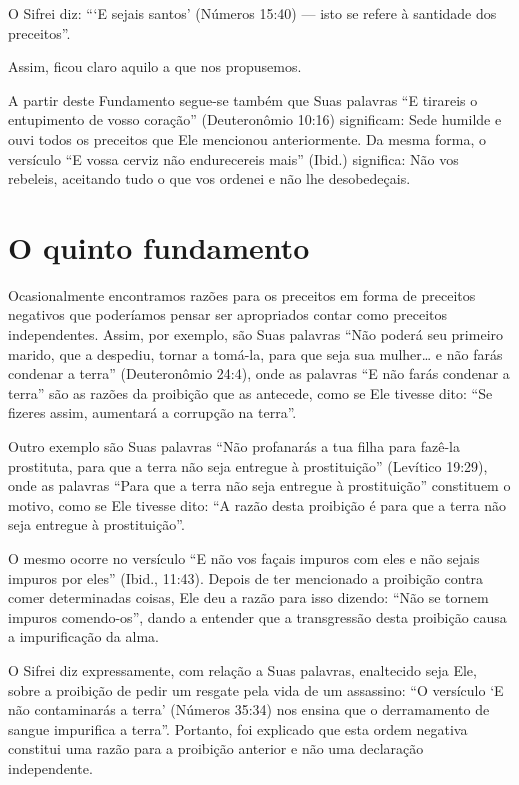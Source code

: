 O Sifrei diz: ```E sejais santos' (Números 15:40) --- isto se refere à
santidade dos preceitos''.

Assim, ficou claro aquilo a que nos propusemos.

A partir deste Fundamento segue-se também que Suas palavras ``E tirareis
o entupimento de vosso coração'' (Deuteronômio 10:16) significam: Sede
humilde e ouvi todos os preceitos que Ele mencionou anteriormente. Da
mesma forma, o versículo ``E vossa cerviz não endurecereis mais''
(Ibid.) significa: Não vos rebeleis, aceitando tudo o que vos ordenei e
não lhe desobedeçais.

\chapter*{O quinto fundamento}

Ocasionalmente encontramos razões para os preceitos em forma de
preceitos negativos que poderíamos pensar ser apropriados contar como
preceitos independentes. Assim, por exemplo, são Suas palavras ``Não
poderá seu primeiro marido, que a despediu, tornar a tomá-la, para que
seja sua mulher\ldots{} e não farás condenar a terra'' (Deuteronômio 24:4),
onde as palavras ``E não farás condenar a terra'' são as razões da
proibição que as antecede, como se Ele tivesse dito: ``Se fizeres assim,
aumentará a corrupção na terra''.

Outro exemplo são Suas palavras ``Não profanarás a tua filha para
fazê-la prostituta, para que a terra não seja entregue à prostituição''
(Levítico 19:29), onde as palavras ``Para que a terra não seja entregue
à prostituição'' constituem o motivo, como se Ele tivesse dito: ``A
razão desta proibição é para que a terra não seja entregue à
prostituição''.

O mesmo ocorre no versículo ``E não vos façais impuros com eles e não
sejais impuros por eles'' (Ibid., 11:43). Depois de ter mencionado a
proibição contra comer determinadas coisas, Ele deu a razão para isso
dizendo: ``Não se tornem impuros comendo-os'', dando a entender que a
transgressão desta proibição causa a impurificação da alma.

O Sifrei diz expressamente, com relação a Suas palavras, enaltecido seja
Ele, sobre a proibição de pedir um resgate pela vida de um assassino:
``O versículo `E não contaminarás a terra' (Números 35:34) nos ensina
que o derramamento de sangue impurifica a terra''. Portanto, foi
explicado que esta ordem negativa constitui uma razão para a proibição
anterior e não uma declaração independente.


